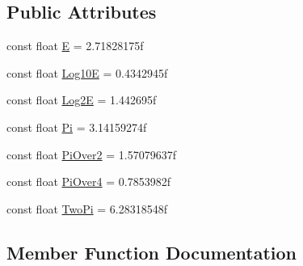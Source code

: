 \subsection*{Public Attributes}
\begin{DoxyCompactItemize}
\item 
const float \hyperlink{classMicrosoft_1_1Xna_1_1Framework_1_1MathHelper_a23dab261164458eefd1df9c4d97e8bf9}{E} = 2.\+71828175f
\item 
const float \hyperlink{classMicrosoft_1_1Xna_1_1Framework_1_1MathHelper_a1295336c5b90a08c4a1b34787edd9702}{Log10\+E} = 0.\+4342945f
\item 
const float \hyperlink{classMicrosoft_1_1Xna_1_1Framework_1_1MathHelper_a63036d227a7719425e26067d9e722667}{Log2\+E} = 1.\+442695f
\item 
const float \hyperlink{classMicrosoft_1_1Xna_1_1Framework_1_1MathHelper_a26722c3df2ea3f0f62eef1a57cf05016}{Pi} = 3.\+14159274f
\item 
const float \hyperlink{classMicrosoft_1_1Xna_1_1Framework_1_1MathHelper_a49586d2f5d3d4a19514c8ca66c181f10}{Pi\+Over2} = 1.\+57079637f
\item 
const float \hyperlink{classMicrosoft_1_1Xna_1_1Framework_1_1MathHelper_a29dad6a672f0dd56bdefbe9e1063fa61}{Pi\+Over4} = 0.\+7853982f
\item 
const float \hyperlink{classMicrosoft_1_1Xna_1_1Framework_1_1MathHelper_a8905fde37d88e7ddd4eb71eae6de7d21}{Two\+Pi} = 6.\+28318548f
\end{DoxyCompactItemize}


\subsection{Member Function Documentation}
\hypertarget{classMicrosoft_1_1Xna_1_1Framework_1_1MathHelper_aefbe2bd900fb815ce5d2a500e108c737}{}
